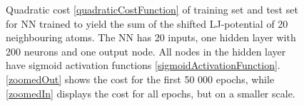 \documentclass[twoside,english]{uiofysmaster}
\begin{document}

\begin{figure}[H]
\centering
{}
\caption{Quadratic cost \eqref{quadraticCostFunction} of training set and test set for NN trained to yield
	 the sum of the shifted LJ-potential of 20 neighbouring atoms. 
	 The NN has 20 inputs, one hidden layer 
	 with 200 neurons and one output node. All nodes in the hidden layer have sigmoid activation functions 
	 \eqref{sigmoidActivationFunction}. \autoref{zoomedOut} shows the cost for the first 50 000 epochs, while
	 \autoref{zoomedIn} displays the cost for all epochs, but on a smaller scale.}	 
\label{fig:trainingManyNeighbourNN}
\end{figure}
\end{document}
